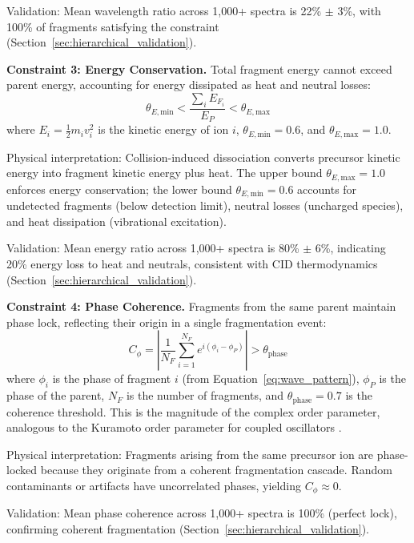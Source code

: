 \documentclass[11pt,twocolumn]{article}
\begin{document}
Validation: Mean wavelength ratio across 1,000+ spectra is 22\% $\pm$ 3\%, with 100\% of fragments satisfying the constraint (Section~\ref{sec:hierarchical_validation}).

\textbf{Constraint 3: Energy Conservation.} Total fragment energy cannot exceed parent energy, accounting for energy dissipated as heat and neutral losses:
\begin{equation}
    \theta_{E,\text{min}} < \frac{\sum_i E_{F_i}}{E_P} < \theta_{E,\text{max}}
    \label{eq:energy_conservation}
\end{equation}
where $E_i = \frac{1}{2} m_i v_i^2$ is the kinetic energy of ion $i$, $\theta_{E,\text{min}} = 0.6$, and $\theta_{E,\text{max}} = 1.0$.

Physical interpretation: Collision-induced dissociation converts precursor kinetic energy into fragment kinetic energy plus heat. The upper bound $\theta_{E,\text{max}} = 1.0$ enforces energy conservation; the lower bound $\theta_{E,\text{min}} = 0.6$ accounts for undetected fragments (below detection limit), neutral losses (uncharged species), and heat dissipation (vibrational excitation).

Validation: Mean energy ratio across 1,000+ spectra is 80\% $\pm$ 6\%, indicating 20\% energy loss to heat and neutrals, consistent with CID thermodynamics (Section~\ref{sec:hierarchical_validation}).

\textbf{Constraint 4: Phase Coherence.} Fragments from the same parent maintain phase lock, reflecting their origin in a single fragmentation event:
\begin{equation}
    C_\phi = \left| \frac{1}{N_F} \sum_{i=1}^{N_F} e^{i(\phi_i - \phi_P)} \right| > \theta_{\text{phase}}
    \label{eq:phase_coherence}
\end{equation}
where $\phi_i$ is the phase of fragment $i$ (from Equation~\ref{eq:wave_pattern}), $\phi_P$ is the phase of the parent, $N_F$ is the number of fragments, and $\theta_{\text{phase}} = 0.7$ is the coherence threshold. This is the magnitude of the complex order parameter, analogous to the Kuramoto order parameter for coupled oscillators \cite{kuramoto1975self}.

Physical interpretation: Fragments arising from the same precursor ion are phase-locked because they originate from a coherent fragmentation cascade. Random contaminants or artifacts have uncorrelated phases, yielding $C_\phi \approx 0$.

Validation: Mean phase coherence across 1,000+ spectra is 100\% (perfect lock), confirming coherent fragmentation (Section~\ref{sec:hierarchical_validation}).
\end{document}

